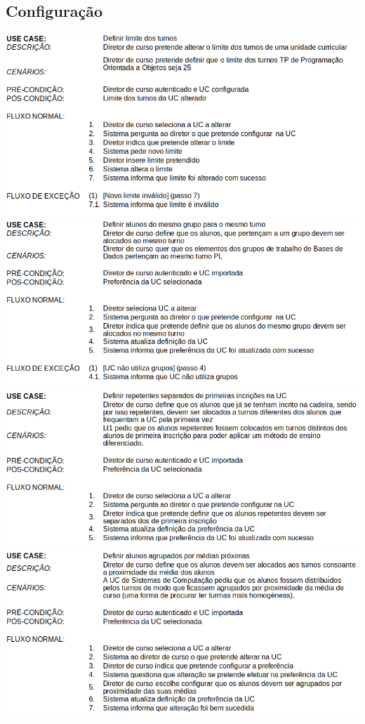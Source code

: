 \documentclass[a4paper,12pt]{article}
\begin{document}
    \subsection{Configuração}
    \includegraphics[width=\textwidth]{limiteTurnos.png}\vspace{2cm}
    \includegraphics[width=\textwidth]{grupoTurno.png}
    \includegraphics[width=\textwidth]{repetentes.png}\vspace{2cm}
    \includegraphics[width=\textwidth]{grupoMedia.png}
\end{document}
